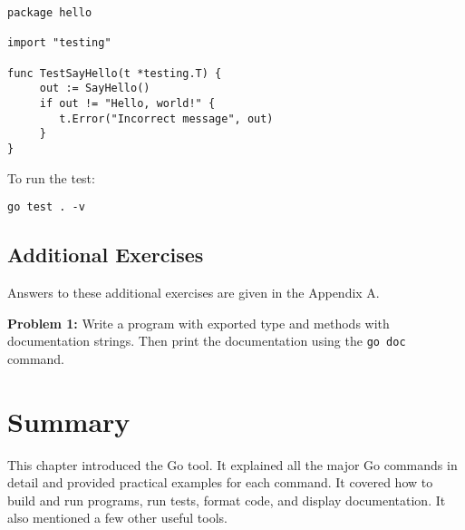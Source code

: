 \begin{lstlisting}[numbers=none]
package hello

import "testing"

func TestSayHello(t *testing.T) {
     out := SayHello()
     if out != "Hello, world!" {
        t.Error("Incorrect message", out)
     }
}
\end{lstlisting}

To run the test:

\begin{lstlisting}[numbers=none]
go test . -v
\end{lstlisting}

\subsection{Additional Exercises}

Answers to these additional exercises are given in the Appendix A.

{\bfseries Problem 1:} Write a program with exported type and methods
with documentation strings.  Then print the documentation
using the \texttt{go doc} command.

\section*{Summary}

This chapter introduced the Go tool. It explained all the major Go commands in
detail and provided practical examples for each command. It covered how to build
and run programs, run tests, format code, and display documentation. It also
mentioned a few other useful tools.
